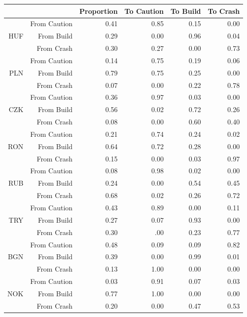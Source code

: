 \documentclass[12pt, a4paper, oneside]{article} %
\begin{document}
\begin{table}[!h]
\centering
\begin{tabular}{rrrrrr}
  \hline
 & & Proportion & To Caution & To Build & To Crash \\ 
  \hline
\multirow{3}{*}{HUF} & From Caution & 0.41 & 0.85 & 0.15 & 0.00  \\ 
   & From Build & 0.29  & 0.00 & 0.96 & 0.04 \\ 
   & From Crash & 0.30 & 0.27 & 0.00 & 0.73 \\ 
\hline
\multirow{3}{*}{PLN} & From Caution & 0.14 & 0.75 & 0.19 & 0.06 \\ 
   & From Build & 0.79 & 0.75 & 0.25 & 0.00 \\ 
   & From Crash & 0.07 & 0.00 & 0.22 & 0.78 \\ 
\hline
\multirow{3}{*}{CZK}  & From Caution & 0.36 & 0.97 & 0.03 & 0.00 \\ 
   & From Build & 0.56 & 0.02 & 0.72 & 0.26 \\ 
   & From Crash & 0.08 & 0.00 & 0.60 & 0.40 \\ 
\hline
\multirow{3}{*}{RON}& From Caution & 0.21 & 0.74 & 0.24 & 0.02 \\ 
   & From Build & 0.64 & 0.72 & 0.28 & 0.00 \\ 
   & From Crash & 0.15 & 0.00 & 0.03 & 0.97 \\ 
\hline
\multirow{3}{*}{RUB}& From Caution & 0.08 & 0.98 & 0.02 & 0.00 \\ 
   & From Build & 0.24 & 0.00 & 0.54 & 0.45 \\ 
   & From Crash & 0.68 & 0.02 & 0.26 & 0.72 \\ 
\hline
\multirow{3}{*}{TRY}  & From Caution & 0.43 & 0.89 & 0.00 & 0.11 \\ 
   & From Build & 0.27 & 0.07 & 0.93 & 0.00 \\ 
   & From Crash & 0.30 & .00 & 0.23 & 0.77 \\ 
\hline
\multirow{3}{*}{BGN}  & From Caution & 0.48 & 0.09 & 0.09 & 0.82 \\ 
   & From Build & 0.39 & 0.00 & 0.99 & 0.01 \\ 
   & From Crash & 0.13 & 1.00 & 0.00 & 0.00 \\ 
\hline
\multirow{3}{*}{NOK}  & From Caution & 0.03 & 0.91 & 0.07 & 0.03 \\ 
   & From Build & 0.77 & 1.00 & 0.00 & 0.00 \\ 
  & From Crash & 0.20 & 0.00 & 0.47 & 0.53 \\ 

\end{tabular}
\end{table}
\end{document}
